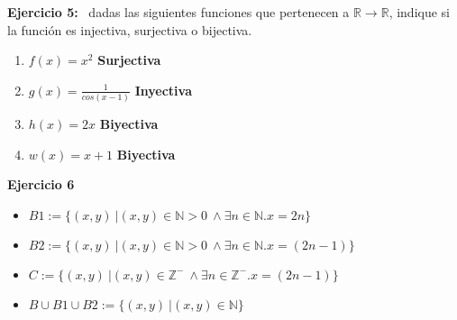 \documentclass[10pt,a4paper]{article}
\begin{document}
{\bf Ejercicio 5:}
\ 
dadas las siguientes funciones que pertenecen a $\mathbb{R}\rightarrow \mathbb{R}$, indique si la funci\'on es injectiva, surjectiva o bijectiva.

\begin{enumerate}
	\item{$f(x)=x^2$}   {\bf Surjectiva} 
	\item{$g(x)=\frac{1}{cos(x-1)}$}  {\bf Inyectiva} 
	\item{$h(x)=2x$}  {\bf Biyectiva}
	\item{$w(x)=x+1$}  {\bf Biyectiva}
\end{enumerate}

\textbf{Ejercicio 6}

\begin{itemize}
	\item {$B1:=\{(x,y) \ | (x,y) \in \mathbb{N} > 0 \ \wedge \exists n \in \mathbb{N}. x=2n \}$}
	
	\item {$B2:=\{(x,y) \ | (x,y) \in \mathbb{N} > 0 \ \wedge \exists n \in \mathbb{N}. x=(2n-1) \}$}
	
	\item {$C:=\{(x,y) \ | (x,y) \in \mathbb{Z}^-\ \wedge \exists n \in \mathbb{Z}^-. x= (2n-1) \}$}
	
	\item {$B \cup B1 \cup B2:=\{(x,y) \ | (x,y) \in \mathbb{N} \}$}
	 

\end{itemize}


 
\end{document}

